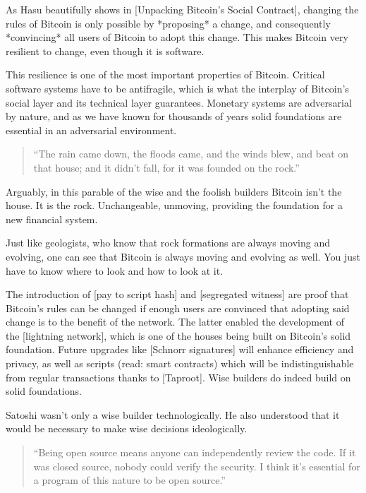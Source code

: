 As Hasu beautifully shows in [Unpacking Bitcoin's Social Contract],
changing the rules of Bitcoin is only possible by *proposing* a change,
and consequently *convincing* all users of Bitcoin to adopt this change.
This makes Bitcoin very resilient to change, even though it is software.

This resilience is one of the most important properties of Bitcoin.
Critical software systems have to be antifragile, which is what the
interplay of Bitcoin's social layer and its technical layer guarantees.
Monetary systems are adversarial by nature, and as we have known for
thousands of years solid foundations are essential in an adversarial
environment.

\begin{quotation}
``The rain came down, the floods came, and the winds blew, and beat on
that house; and it didn't fall, for it was founded on the rock.''
\end{quotation}

Arguably, in this parable of the wise and the foolish builders Bitcoin
isn't the house. It is the rock. Unchangeable, unmoving, providing the
foundation for a new financial system.

Just like geologists, who know that rock formations are always moving
and evolving, one can see that Bitcoin is always moving and evolving as
well. You just have to know where to look and how to look at it.

The introduction of [pay to script hash] and [segregated witness] are
proof that Bitcoin's rules can be changed if enough users are convinced
that adopting said change is to the benefit of the network. The latter
enabled the development of the [lightning network], which is one of the
houses being built on Bitcoin's solid foundation. Future upgrades like
[Schnorr signatures] will enhance efficiency and privacy, as well as
scripts (read: smart contracts) which will be indistinguishable from
regular transactions thanks to [Taproot]. Wise builders do indeed build
on solid foundations.

Satoshi wasn't only a wise builder technologically. He also understood
that it would be necessary to make wise decisions ideologically.

\begin{quotation}
``Being open source means anyone can independently review the code. If
it was closed source, nobody could verify the security. I think it's
essential for a program of this nature to be open source.''
\end{quotation}

